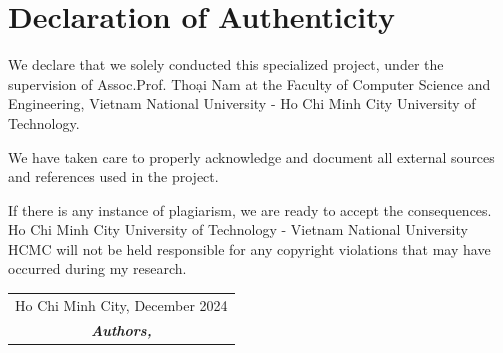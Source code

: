 \chapter*{Declaration of Authenticity}

We declare that we solely conducted this specialized project, under the supervision of Assoc.Prof. Thoại Nam at the Faculty of Computer Science and Engineering, Vietnam National University - Ho Chi Minh City University of Technology.
 
\noindent We have taken care to properly acknowledge and document all external sources and references used in the project.
 
\noindent If there is any instance of plagiarism, we are ready to accept the consequences. Ho Chi Minh City University of Technology - Vietnam National University HCMC will not be held responsible for any copyright violations that may have occurred during my research.

\vspace{2cm}

\begin{flushright}
\begin{tabular}{c}
    Ho Chi Minh City, December 2024 \\
    \textit{\textbf{Authors,}} 
    
\end{tabular}
\end{flushright}